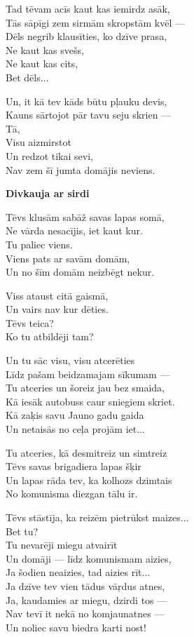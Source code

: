 \documentclass[14pt]{extarticle}
\begin{document}
{{Tad tēvam acīs kaut kas iemirdz asāk,\\
Tās sāpīgi zem sirmām skropstām kvēl ---\\
Dēls negrib klausīties, ko dzīve prasa,\\
Ne kaut kas svešs,\\
Ne kaut kas cits,\\
Bet dēls...

Un, it kā tev kāds būtu pļauku devis,\\
Kauns sārtojot pār tavu seju skrien ---\\
Tā,\\
Visu aizmirstot\\
Un redzot tikai sevi,\\
Nav zem šī jumta domājis neviens. 

\newpage

{\bf Divkauja ar sirdi}

Tēvs klusām sabāž savas lapas somā,\\
Ne vārda nesacījis, iet kaut kur.\\
Tu paliec viens.\\
Viens pats ar savām domām,\\
Un no šīm domām neizbēgt nekur. 

Viss ataust citā gaismā,\\
Un vairs nav kur dēties.\\
Tēvs teica?\\
Ko tu atbildēji tam?

Un tu sāc visu, visu atcerēties\\
Līdz pašam beidzamajam sīkumam ---\\
Tu atceries un šoreiz jau bez smaida,\\
Kā iesāk autobuss caur sniegiem skriet.\\
Kā zaķis savu Jauno gadu gaida\\
Un netaisās no ceļa projām iet...

Tu atceries, kā desmitreiz un simtreiz\\
Tēvs savas brigadiera lapas šķir\\
Un lapas rāda tev, ka kolhozs dzimtais\\
No komunisma diezgan tālu ir. 

Tēvs stāstīja, ka reizēm pietrūkst maizes...\\
Bet tu?\\
Tu nevarēji miegu atvairīt\\
Un domāji --- līdz komunismam aizies,\\
Ja šodien neaizies, tad aizies rīt...\\
Ja dzīve tev vien tādus vāŗdus atnes,\\
Ja, kaudamies ar miegu, dzirdi tos ---\\
Nav tevī it nekā no komjaunatnes ---\\
Un noliec savu biedra karti nost!

}}
\end{document}
